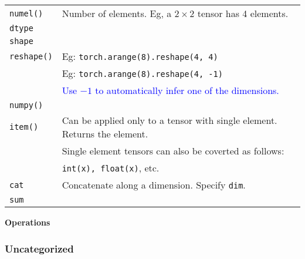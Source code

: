 \begin{tabularx}{\linewidth}{lX}
    \hline
    \texttt{numel()}    & Number of elements. Eg, a $2 \times 2$ tensor has 4 elements.\\
    \texttt{dtype}      & \\
    \texttt{shape}      & \\
    \texttt{reshape()}  & Eg: \texttt{torch.arange(8).reshape(4, 4)}\\
                        & Eg: \texttt{torch.arange(8).reshape(4, -1)}\\
                        & \textcolor{blue}{Use $-1$ to automatically infer one of the dimensions.}\\
    \texttt{numpy()}    & \\
    \texttt{item()}     & Can be applied only to a tensor with single element. Returns the element.\\
                        & Single element tensors can also be coverted as follows:\\
                        & \texttt{int(x), float(x)}, etc.\\
    \hline
    \texttt{cat}        & Concatenate along a dimension. Specify \texttt{dim}.\\
    \texttt{sum}        & \\
\end{tabularx}

\textbf{Operations}\\



\subsubsection*{Uncategorized}

\begin{tabularx}{\linewidth}{lX}
    
\end{tabularx}